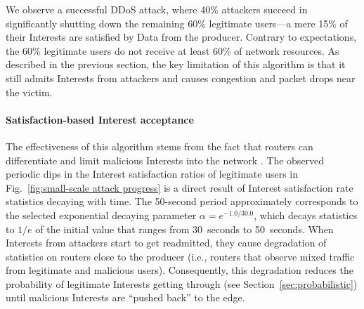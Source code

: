 We observe a successful DDoS attack, where 40\% attackers succeed in significantly shutting down the remaining 60\% legitimate users---a mere 15\% of their Interests are satisfied by Data from the producer. Contrary to expectations, the 60\% legitimate users do not receive at least 60\% of network resources. As described in the previous section, the key limitation of this algorithm is that it still admits Interests from attackers and causes congestion and packet drops near the victim. %


\paragraph{\textbf{Satisfaction-based Interest acceptance}}

The effectiveness of this algorithm stems from the fact that routers can differentiate and limit malicious Interests into the network%
. The observed periodic dips in the Interest satisfaction ratios of legitimate users in Fig.~\ref{fig:small-scale attack progress} is a direct result of Interest satisfaction rate statistics decaying with time. The 50-second period approximately corresponds to the selected exponential decaying parameter $\alpha=e^{−1.0/30.0}$, which decays statistics to $1/e$ of the initial value that ranges from 30~seconds to 50~seconds. 
When Interests from attackers start to get readmitted, they cause degradation of statistics on routers close to the producer (i.e., routers that observe mixed traffic from legitimate and malicious users). Consequently, this degradation reduces the probability of legitimate Interests getting through (see Section~\ref{sec:probabilistic}) until malicious Interests are ``pushed back'' to the edge.

